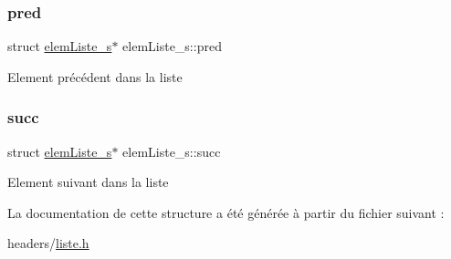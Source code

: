 \subsubsection{\texorpdfstring{pred}{pred}}
{\footnotesize\ttfamily struct \hyperlink{structelem_liste__s}{elem\+Liste\+\_\+s}$\ast$ elem\+Liste\+\_\+s\+::pred}

Element précédent dans la liste \mbox{\label{structelem_liste__s_aeff23ea23591554c3150bf0df829f7d4}} 
\subsubsection{\texorpdfstring{succ}{succ}}
{\footnotesize\ttfamily struct \hyperlink{structelem_liste__s}{elem\+Liste\+\_\+s}$\ast$ elem\+Liste\+\_\+s\+::succ}

Element suivant dans la liste 

La documentation de cette structure a été générée à partir du fichier suivant \+:\begin{DoxyCompactItemize}
\item 
headers/\hyperlink{liste_8h}{liste.\+h}\end{DoxyCompactItemize}
